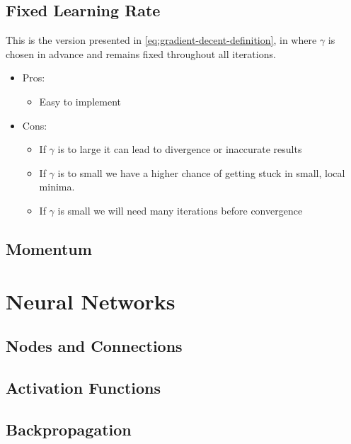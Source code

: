 \documentclass[Thesis.tex]{subfiles}
\begin{document}
\subsection{Fixed Learning Rate}

This is the version presented in \cref{eq:gradient-decent-definition}, in where
$\gamma$ is chosen in advance and remains fixed throughout all iterations.

\begin{itemize}
\item Pros:
  \begin{itemize}
  \item Easy to implement
  \end{itemize}
\item Cons:
  \begin{itemize}
  \item If $\gamma$ is to large it can lead to divergence or inaccurate results
  \item If $\gamma$ is to small we have a higher chance of getting stuck in small, local minima.
  \item If $\gamma$ is small we will need many iterations before convergence
  \end{itemize}
\end{itemize}

\subsection{Momentum}

\section{Neural Networks}

\subsection{Nodes and Connections}

\subsection{Activation Functions}

\subsection{Backpropagation}
\end{document}
